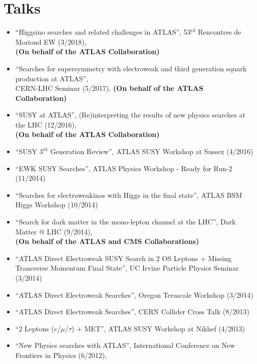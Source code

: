 \documentclass[a4paper,10pt]{article}
\begin{document}
\vspace{3mm}
\section{Talks}

\begin{itemize}
	\item ``Higgsino searches and related challenges in ATLAS'', 53$^{\mathrm rd}$ Rencontres de Moriond EW (3/2018),
	\\ {\bf (On behalf of the ATLAS Collaboration)}
	\item ``Searches for supersymmetry with electroweak and third generation squark production at ATLAS'', \\ CERN-LHC Seminar (5/2017), 
	{\bf (On behalf of the ATLAS Collaboration)}
	\item ``SUSY at ATLAS'', (Re)interpreting the results of new physics searches at the LHC (12/2016),
	\\ {\bf (On behalf of the ATLAS Collaboration)}
	\item ``SUSY $3^{\mathrm{rd}}$ Generation Review'', ATLAS SUSY Workshop at Sussex (4/2016)
	\item ``EWK SUSY Searches'', ATLAS Physics Workshop - Ready for Run-2  (11/2014)
	\item ``Searches for electroweakinos with Higgs in the final state'', ATLAS BSM Higgs Workshop (10/2014)
	\item  ``Search for dark matter in the mono-lepton channel at the LHC'', Dark Matter @ LHC (9/2014), 
	\\ {\bf (On behalf of the ATLAS and CMS Collaborations)}
	\item ``ATLAS Direct Electroweak SUSY Search in 2 OS Leptons + Missing Transverse Momentum Final State'', 
	UC Irvine Particle Physics Seminar (3/2014)
	\item ``ATLAS Direct Electroweak Searches'', Oregon Terascale Workshop (3/2014)
	\item ``ATLAS Direct Electroweak Searches'', CERN Collider Cross Talk (8/2013)
	\item ``2 Leptons ($e$/$\mu$/$\tau$) + MET'', ATLAS SUSY Workshop at Nikhef (4/2013)
	\item ``New Physics searches with ATLAS'', International Conference on New Frontiers in Physics (6/2012),

\end{itemize}
\end{document}
